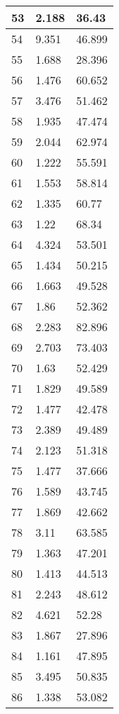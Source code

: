 \begin{table}[!ht]
\begin{tabular}{|l|l|l|}
        53 & 2.188 & 36.43 \\ \hline
        54 & 9.351 & 46.899 \\ \hline
        55 & 1.688 & 28.396 \\ \hline
        56 & 1.476 & 60.652 \\ \hline
        57 & 3.476 & 51.462 \\ \hline
        58 & 1.935 & 47.474 \\ \hline
        59 & 2.044 & 62.974 \\ \hline
        60 & 1.222 & 55.591 \\ \hline
        61 & 1.553 & 58.814 \\ \hline
        62 & 1.335 & 60.77 \\ \hline
        63 & 1.22 & 68.34 \\ \hline
        64 & 4.324 & 53.501 \\ \hline
        65 & 1.434 & 50.215 \\ \hline
        66 & 1.663 & 49.528 \\ \hline
        67 & 1.86 & 52.362 \\ \hline
        68 & 2.283 & 82.896 \\ \hline
        69 & 2.703 & 73.403 \\ \hline
        70 & 1.63 & 52.429 \\ \hline
        71 & 1.829 & 49.589 \\ \hline
        72 & 1.477 & 42.478 \\ \hline
        73 & 2.389 & 49.489 \\ \hline
        74 & 2.123 & 51.318 \\ \hline
        75 & 1.477 & 37.666 \\ \hline
        76 & 1.589 & 43.745 \\ \hline
        77 & 1.869 & 42.662 \\ \hline
        78 & 3.11 & 63.585 \\ \hline
        79 & 1.363 & 47.201 \\ \hline
        80 & 1.413 & 44.513 \\ \hline
        81 & 2.243 & 48.612 \\ \hline
        82 & 4.621 & 52.28 \\ \hline
        83 & 1.867 & 27.896 \\ \hline
        84 & 1.161 & 47.895 \\ \hline
        85 & 3.495 & 50.835 \\ \hline
        86 & 1.338 & 53.082 \\ \hline

\end{tabular}
\end{table}

